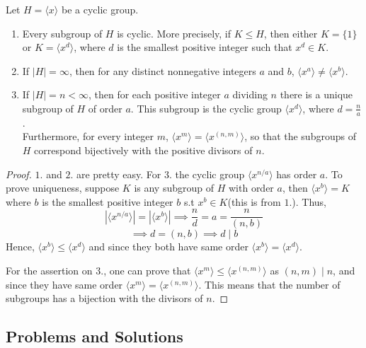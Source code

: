 \begin{theorem}
Let $H = \langle x \rangle$ be a cyclic group. 
\begin{enumerate}
    \item Every subgroup of $H$ is cyclic. More precisely, if $K \leq H$, then either 
    $K = \{1\}$ or $K = \langle x^d \rangle$, where $d$ is the smallest positive integer such that $x^d \in K$.
    
    \item If $|H| = \infty$, then for any distinct nonnegative integers $a$ and $b$, 
    $\langle x^a \rangle \neq \langle x^b \rangle$. 
    
    \item If $|H| = n < \infty$, then for each positive integer $a$ dividing $n$ 
    there is a unique subgroup of $H$ of order $a$. This subgroup is the cyclic group 
    $\langle x^d \rangle$, where $d = \tfrac{n}{a}$. \\
    Furthermore, for every integer $m$, 
    $\langle x^m \rangle = \langle x^{(n,m)} \rangle$, so that the subgroups of $H$ correspond 
    bijectively with the positive divisors of $n$.
\end{enumerate}
\end{theorem}

\begin{proof}
    $1.$ and $2.$ are pretty easy. For $3.$ the cyclic group $\langle x^{n/a} \rangle$ has order $a$. To prove uniqueness,
    suppose $K$ is any subgroup of $H$ with order $a$, then $\langle x^b \rangle = K$ where $b$ is the smallest positive 
    integer $b$ s.t $x^b \in K$(this is from $1.$). Thus,
    \[ |\langle x^{n/a} \rangle|=|\langle x^b \rangle| \implies \frac{n}{d}=a=\frac{n}{(n,b)}\]
    \[ \implies d=(n,b) \implies d \mid b \] 
    Hence, $\langle x^b \rangle \le \langle x^d \rangle $ and since they both have same order $\langle x^b \rangle = \langle x^d \rangle $.
    
    For the assertion on $3.$, one can prove that $\langle x^{m} \rangle  \le \langle x^{(n,m)}\rangle $ as $(n,m) \mid n$, and 
    since they have same order $\langle x^{m}\rangle = \langle x^{(n,m)} \rangle $. This means that the number of subgroups has a bijection
    with the divisors of $n$.
\end{proof}

\eject

\subsection*{Problems and Solutions}

